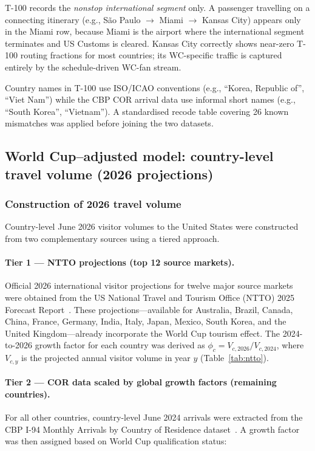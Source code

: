 \documentclass[12pt]{article}
\begin{document}
T-100 records the \emph{nonstop international segment} only. A
passenger travelling on a connecting itinerary (e.g., São Paulo
$\to$ Miami $\to$ Kansas City) appears only in the Miami row, because
Miami is the airport where the international segment terminates and US
Customs is cleared. Kansas City correctly shows near-zero T-100
routing fractions for most countries; its WC-specific traffic is
captured entirely by the schedule-driven WC-fan stream.

Country names in T-100 use ISO/ICAO conventions (e.g.,
``Korea, Republic of'', ``Viet Nam'') while the CBP COR arrival data
use informal short names (e.g., ``South Korea'', ``Vietnam''). A
standardised recode table covering 26 known mismatches was applied
before joining the two datasets.

\subsection*{World Cup--adjusted model: country-level travel
volume (2026 projections)}

\subsubsection*{Construction of 2026 travel volume}

Country-level June 2026 visitor volumes to the United States were
constructed from two complementary sources using a tiered approach.

\paragraph{Tier 1 --- NTTO projections (top 12 source markets).}
Official 2026 international visitor projections for twelve major
source markets were obtained from the US National Travel and Tourism
Office (NTTO) 2025 Forecast Report~\cite{NTTO2025}.
These projections---available for Australia, Brazil, Canada, China,
France, Germany, India, Italy, Japan, Mexico, South Korea, and the
United Kingdom---already incorporate the World Cup tourism effect.
The 2024-to-2026 growth factor for each country was derived as
$\phi_c = V_{c,2026} / V_{c,2024}$, where $V_{c,y}$ is the
projected annual visitor volume in year $y$ (Table~\ref{tab:ntto}).

\paragraph{Tier 2 --- COR data scaled by global growth factors
(remaining countries).}
For all other countries, country-level June 2024 arrivals were
extracted from the CBP I-94 Monthly Arrivals by Country of Residence
dataset~\cite{CBP_I94}. A growth factor was then assigned based
on World Cup qualification status:
\end{document}
